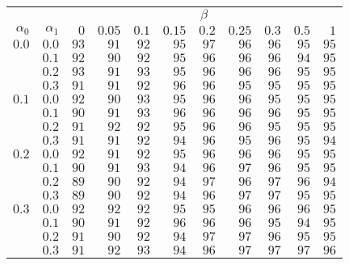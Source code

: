 \begin{tabular}{rr|rrrrrrrrr}
\hline\hline
 && \multicolumn{9}{c}{$\beta$}\\
 $\alpha_0$ & $\alpha_1$ & $0$ & $0.05$ & $0.1$ & $0.15$ & $0.2$ & $0.25$ & $0.3$ & $0.5$ & $1$ \\ 
 \hline
$0.0$ & $0.0$ & $93$ & $91$ & $92$ & $95$ & $97$ & $96$ & $96$ & $95$ & $95$\\ 
 & $0.1$ & $92$ & $90$ & $92$ & $95$ & $96$ & $96$ & $96$ & $94$ & $95$\\ 
 & $0.2$ & $93$ & $91$ & $93$ & $95$ & $96$ & $96$ & $96$ & $95$ & $95$\\ 
 & $0.3$ & $91$ & $91$ & $92$ & $96$ & $96$ & $95$ & $95$ & $95$ & $95$\\ 
\hline 
 $0.1$ & $0.0$ & $92$ & $90$ & $93$ & $95$ & $96$ & $96$ & $95$ & $95$ & $95$\\ 
 & $0.1$ & $90$ & $91$ & $93$ & $96$ & $96$ & $96$ & $96$ & $95$ & $95$\\ 
 & $0.2$ & $91$ & $92$ & $92$ & $95$ & $96$ & $96$ & $95$ & $95$ & $95$\\ 
 & $0.3$ & $91$ & $91$ & $92$ & $94$ & $96$ & $95$ & $96$ & $95$ & $94$\\ 
\hline 
 $0.2$ & $0.0$ & $92$ & $91$ & $92$ & $95$ & $96$ & $96$ & $96$ & $95$ & $95$\\ 
 & $0.1$ & $90$ & $91$ & $93$ & $94$ & $96$ & $97$ & $96$ & $95$ & $95$\\ 
 & $0.2$ & $89$ & $90$ & $92$ & $94$ & $97$ & $96$ & $97$ & $96$ & $94$\\ 
 & $0.3$ & $89$ & $90$ & $92$ & $94$ & $96$ & $97$ & $97$ & $95$ & $95$\\ 
\hline 
 $0.3$ & $0.0$ & $92$ & $92$ & $92$ & $95$ & $95$ & $96$ & $96$ & $96$ & $95$\\ 
 & $0.1$ & $90$ & $91$ & $92$ & $96$ & $96$ & $96$ & $95$ & $94$ & $95$\\ 
 & $0.2$ & $91$ & $90$ & $92$ & $94$ & $97$ & $97$ & $96$ & $95$ & $95$\\ 
 & $0.3$ & $91$ & $92$ & $93$ & $94$ & $96$ & $97$ & $97$ & $97$ & $96$\\ 
 \hline 
 \end{tabular}